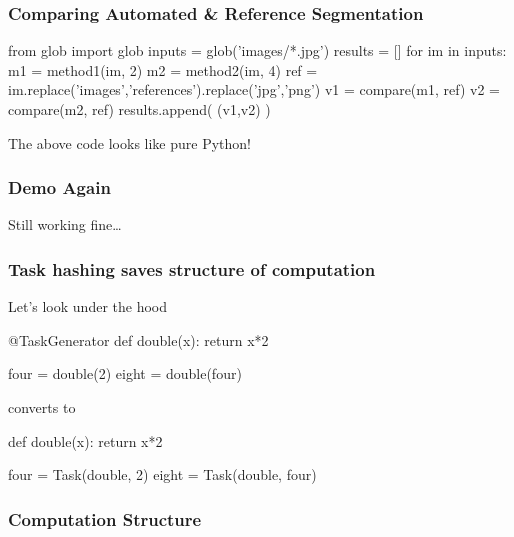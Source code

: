 \documentclass{beamer}
\begin{document}
\begin{frame}[fragile]
\frametitle{Comparing Automated \& Reference Segmentation}

\begin{python}
from glob import glob
inputs = glob('images/*.jpg')
results = []
for im in inputs:
    m1 = method1(im, 2)
    m2 = method2(im, 4)
    ref = im.replace('images','references').replace('jpg','png')
    v1 = compare(m1, ref)
    v2 = compare(m2, ref)
    results.append( (v1,v2) )
\end{python}

The above code looks like pure Python!
\end{frame}


\begin{frame}[fragile]
\frametitle{Demo Again}

Still working fine\ldots

\end{frame}


\begin{frame}[fragile]
\frametitle{Task hashing saves structure of computation}

\begin{block}{Let's look under the hood}
\begin{python}
@TaskGenerator
def double(x):
    return x*2

four = double(2)
eight = double(four)
\end{python}

\alert{converts to}

\begin{python}

def double(x):
    return x*2

four = Task(double, 2)
eight = Task(double, four)
\end{python}

\end{block}

\end{frame}

\begin{frame}[fragile]
\frametitle{Computation Structure}


\begin{center}

\end{center}

\end{frame}
\end{document}
